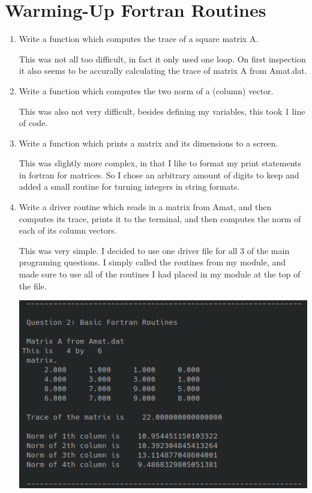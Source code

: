 \documentclass{article}
\begin{document}
\section{Warming-Up Fortran Routines}
\begin{enumerate}
\item Write a function which computes the trace of a square matrix A. 

This was not all too difficult, in fact it only used one loop. On first inspection it also seems to be accurally calculating the trace of matrix A from Amat.dat. 

\item Write a function which computes the two norm of a (column) vector.

This was also not very difficult, besides defining my variables, this took 1 line of code. 

\item Write a function which prints a matrix and its dimensions to a screen.

This was slightly more complex, in that I like to format my print statements in fortran for matrices. So I chose an arbitrary amount of digits to keep and added a small routine for turning integers in string formats.

\item Write a driver routine which reads in a matrix from Amat, and then computes its trace, prints it to the terminal, and then computes the norm of each of its column vectors. 

This was very simple. I decided to use one driver file for all 3 of the main programing questions. I simply called the routines from my module, and made sure to use all of the routines I had placed in my module at the top of the file. 

\begin{center}
    \includegraphics[width = .6\textwidth]{files/Q2sol.png}
\end{center}

\end{enumerate}
\end{document}

